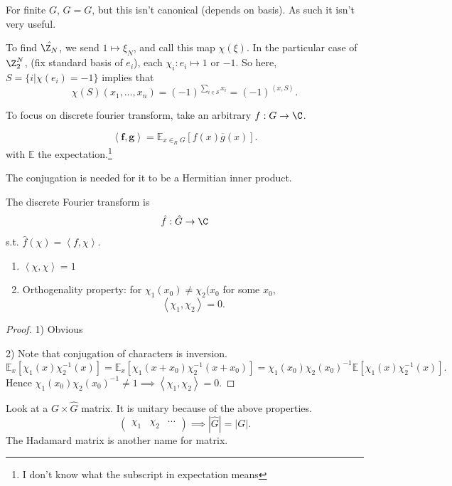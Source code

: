 \documentclass[a4paper]{article}
\begin{document}
For finite $G $, $\hat{G} = G  $, but this isn't canonical (depends on basis).
As such it isn't very useful.

To find $\hat{\Z_N}  $, we send $1\mapsto \xi_N $, and call this map $\chi(\xi) $.
In the particular case of $\Z_{2}^{N}  $, (fix standard basis of $e_{i} $), each $\chi_i: e_i \mapsto 1 $ or $-1 $.
So here, $S = \{i| \chi(e_i) = -1\}   $ implies that
\[
	\chi(S)(x_{1},\ldots,x_n) = (-1)^{\sum_{i\in S}x_i} = (-1)^{\left< x,S \right>}
.\]

To focus on discrete fourier transform, take an arbitrary $f: G\to \C $.

\begin{definition}
	\[
		\bm{\left< f,g \right>} = \mathbb{E}_{x\in_R G}[f(x)\overline{g}(x)]
	.\]
	with $\mathbb{E} $ the expectation.\footnote{I don't know what the subscript in expectation means}
\end{definition}

The conjugation is needed for it to be a Hermitian inner product.

\begin{definition}
	The discrete Fourier transform is
	\[
		\hat{f}:\hat{G} \to \C
	\]
	s.t. $\hat{f}(\chi) = \left< f,\chi  \right>  $.
\end{definition}

\begin{property}
	\begin{enumerate}
		\item $\left< \chi ,\chi  \right> =1$
		\item Orthogenality property: for $\chi_{1}(x_{0})\ne \chi_{2}(x_{0} $ for some $x_{0} $,
			\[
				\left< \chi_{1},\chi_{2} \right> = 0
			.\]
	\end{enumerate}
\end{property}
\begin{proof}
	1) Obvious

	2) Note that conjugation of characters is inversion.
	\[
		\mathbb{E}_x[\chi_{1}(x)\chi_{2}^{-1}(x)] = \mathbb{E}_x[\chi_{1}(x+x_{0})\chi_{2}^{-1}(x+x_{0})] = \chi_{1}(x_{0})\chi_{2}(x_{0})^{-1}\mathbb{E}[\chi_{1}(x)\chi_{2}^{-1}(x)]
	.\]
	Hence $\chi_{1}(x_{0}) \chi_{2}(x_{0})^{-1} \ne 1 \implies \left< \chi_{1},\chi_{2} \right> = 0$.
\end{proof}

Look at a $G\times \hat{G}  $ matrix.
It is unitary because of the above properties.
\[
	\begin{pmatrix} \chi_{1} & \chi_{2} & \cdots \end{pmatrix}  \implies |\hat{G}| = |G|
.\]
The Hadamard matrix is another name for matrix.
\end{document}
